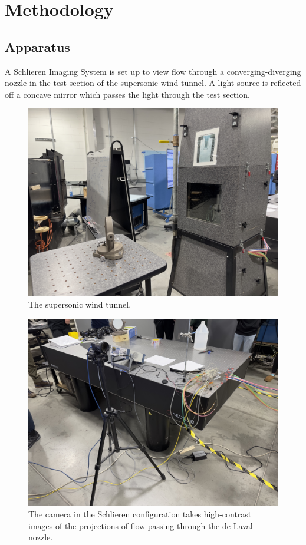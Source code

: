 \chapter{Methodology} \label{cp:methodology}

\section{Apparatus} \label{sec:apparatus}
A Schlieren Imaging System is set up to view flow through a converging-diverging nozzle in the test section of the supersonic wind tunnel. A light source is reflected off a concave mirror which passes the light through the test section. 

\begin{figure}[htpb]
    \centering
    \includegraphics[width=0.75\linewidth]{Figures/back_of_supersonic_wind_tunnel.jpeg}
    \caption{The supersonic wind tunnel.}
    \label{fig:supersonic_wind_tunnel}
\end{figure}

\begin{figure}[htpb]
    \centering
    \includegraphics[width=0.75\linewidth]{Figures/camera.jpeg}
    \caption{The camera in the Schlieren configuration takes high-contrast images of the projections of flow passing through the de Laval nozzle.}
    \label{fig:camera}
\end{figure}


